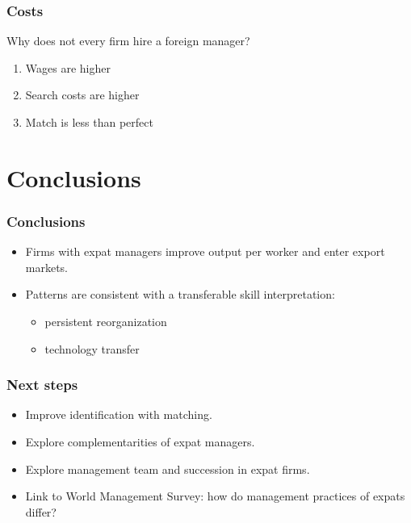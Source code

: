 \documentclass[aspectratio=43,compress,mathserif]{beamer}
\begin{document}
\begin{frame}\frametitle{Costs}\hypertarget{Costs}{}
Why does not every firm hire a foreign manager?


\begin{enumerate}\setcounter{enumi}{0}
\item Wages are higher 

\item Search costs are higher

\item Match is less than perfect






\end{enumerate}
\end{frame}







\section{Conclusions}\hypertarget{Conclusions}{}
\begin{frame}\frametitle{Conclusions}\hypertarget{Conclusions}{}
\begin{itemize}
\item Firms with expat managers improve output per worker and enter export markets.

\item Patterns are consistent with a transferable skill interpretation:
\begin{itemize}
\item persistent reorganization

\item technology transfer


\end{itemize}

\end{itemize}
\end{frame}



\begin{frame}\frametitle{Next steps}\hypertarget{Next steps}{}
\begin{itemize}
\item Improve identification with matching.

\item Explore complementarities of expat managers.

\item Explore management team and succession in expat firms.

\item Link to World Management Survey: how do management practices of expats differ?
\end{itemize}
\end{frame}
\end{document}

